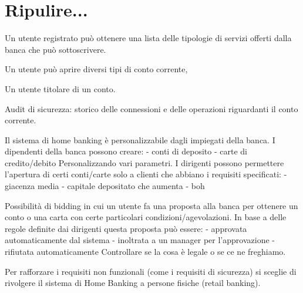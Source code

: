 \documentclass[10pt]{softeng} %
\begin{document}
\startofdocument{}



\section{Ripulire...}


Un utente registrato pu\`o ottenere una lista delle tipologie di servizi offerti dalla banca che pu\`o sottoscrivere.

Un utente pu\`o aprire diversi tipi di conto corrente, 

Un utente titolare di un conto.

Audit di sicurezza:
storico delle connessioni e delle operazioni riguardanti il conto corrente.

Il sistema di home banking \`e personalizzabile dagli impiegati della banca.
I dipendenti della banca possono creare:
- conti di deposito
- carte di credito/debito
Personalizzando vari parametri.
I dirigenti possono permettere l'apertura di certi conti/carte solo a clienti che abbiano i requisiti specificati:
- giacenza media
- capitale depositato che aumenta
- boh

Possibilit\`a di bidding in cui un utente fa una proposta alla banca per ottenere un conto o una carta con certe particolari condizioni/agevolazioni.
In base a delle regole definite dai dirigenti questa proposta pu\`o essere:
- approvata automaticamente dal sistema
- inoltrata a un manager per l'approvazione
- rifiutata automaticamente
Controllare se la cosa \`e legale o se ce ne freghiamo.




Per rafforzare i requisiti non funzionali (come i requisiti di sicurezza) si sceglie di rivolgere il sistema di Home Banking a persone fisiche (retail banking).
\end{document}
